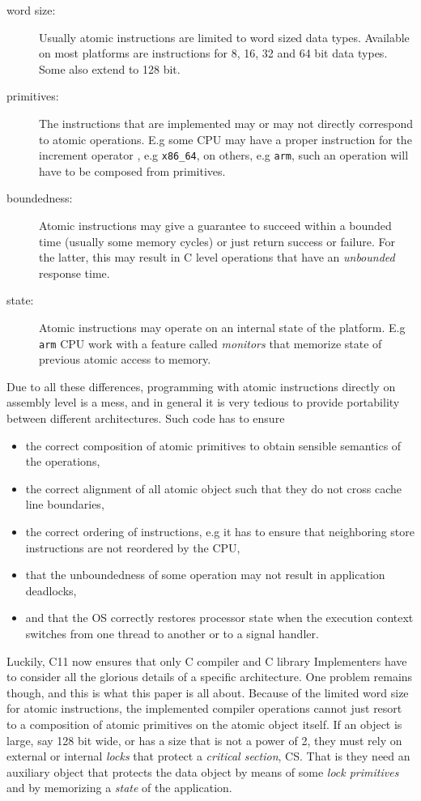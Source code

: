 \begin{description}
\item[{word size:}] Usually atomic instructions are limited to word
sized data types. Available on most platforms are
instructions for 8, 16, 32 and 64 bit
data types. Some also extend to 128 bit.\itemadjust
\item[{primitives:}] The instructions that are implemented may or may
not directly correspond to atomic operations. E.g
some CPU may have a proper instruction for the
increment operator \code{++}, e.g \texttt{x86\_64}, on others,
e.g \texttt{arm}, such an operation will have to be
composed from primitives.\itemadjust
\item[{boundedness:}] Atomic instructions may give a guarantee to
succeed within a bounded time (usually some
memory cycles) or just return success or
failure. For the latter, this may result in C
level operations that have an \emph{unbounded}
response time.\itemadjust
\item[{state:}] Atomic instructions may operate on an internal state of
the platform. E.g \texttt{arm} CPU work with a feature called
\emph{monitors} that memorize state of previous atomic
access to memory.\itemadjust
\end{description}

Due to all these differences, programming with atomic instructions
directly on assembly level is a mess, and in general it is very
tedious to provide portability between different
architectures. Such code has to ensure\itemadjust
\begin{itemize}
\item the correct composition of atomic primitives to obtain sensible
semantics of the operations,\itemadjust
\item the correct alignment of all atomic object such that they do not
cross cache line boundaries,\itemadjust
\item the correct ordering of instructions, e.g it has to ensure that
neighboring store instructions are not reordered by the CPU,
\itemadjust
\item that the unboundedness of some operation may not result in
application deadlocks,\itemadjust
\item and that the OS correctly restores processor state when the
execution context switches from one thread to another or to a
signal handler.
\end{itemize}

Luckily, C11 now ensures that only C compiler and C library
Implementers have to consider all the glorious details of a
specific architecture. One problem remains though, and this is what
this paper is all about. Because of the limited word size for
atomic instructions, the implemented compiler operations cannot just
resort to a composition of atomic primitives on the atomic object
itself. If an object is large, say 128 bit wide, or has a size that
is not a power of 2, they must rely on external or internal \emph{locks}
that protect a \emph{critical section}, CS. That is they need an
auxiliary object that protects the data object by means of some
\emph{lock primitives} and by memorizing a \emph{state} of the application.

